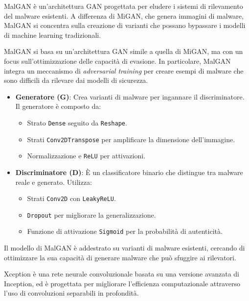 
MalGAN è un'architettura GAN progettata per eludere i sistemi di rilevamento del malware esistenti. A differenza di MiGAN, che genera immagini di malware, MalGAN si concentra sulla creazione di varianti che possano bypassare i modelli di machine learning tradizionali.

MalGAN si basa su un'architettura GAN simile a quella di MiGAN, ma con un focus sull'ottimizzazione delle capacità di evasione. In particolare, MalGAN integra un meccanismo di \textit{adversarial training} per creare esempi di malware che sono difficili da rilevare dai modelli di sicurezza.
\begin{itemize}
    \item \textbf{Generatore (G)}: Crea varianti di malware per ingannare il discriminatore. Il generatore è composto da:
    \begin{itemize}
        \item Strato \texttt{Dense} seguito da \texttt{Reshape}.
        \item Strati \texttt{Conv2DTranspose} per amplificare la dimensione dell'immagine.
        \item Normalizzazione e \texttt{ReLU} per attivazioni.
    \end{itemize}
    \item \textbf{Discriminatore (D)}: È un classificatore binario che distingue tra malware reale e generato. Utilizza:
    \begin{itemize}
        \item Strati \texttt{Conv2D} con \texttt{LeakyReLU}.
        \item \texttt{Dropout} per migliorare la generalizzazione.
        \item Funzione di attivazione \texttt{Sigmoid} per la probabilità di autenticità.
    \end{itemize}
\end{itemize}
Il modello di MalGAN è addestrato su varianti di malware esistenti, cercando di ottimizzare la sua capacità di generare malware che può sfuggire ai rilevatori.


Xception è una rete neurale convoluzionale basata su una versione avanzata di Inception, ed è progettata per migliorare l'efficienza computazionale attraverso l'uso di convoluzioni separabili in profondità.

